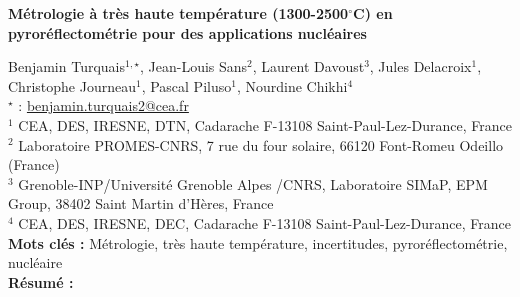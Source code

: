 


    \newpage


%
\begin{flushleft}
\addtocounter{section}{1}
{\Large \textbf{Métrologie à très haute température (1300-2500$^{\circ}$C) en pyroréflectométrie pour des applications nucléaires}}\label{ref:14}
\end{flushleft}
%
Benjamin Turquais$^{1,\star}$, Jean-Louis Sans$^{2}$, Laurent Davoust$^{3}$, Jules Delacroix$^{1}$, Christophe Journeau$^{1}$, Pascal Piluso$^{1}$, Nourdine Chikhi$^{4}$\\[2mm]
$^{\star}$ \Letter : \url{benjamin.turquais2@cea.fr}\\[2mm]
{\footnotesize $^{1}$ CEA, DES, IRESNE, DTN, Cadarache F-13108 Saint-Paul-Lez-Durance, France}\\
{\footnotesize $^{2}$ Laboratoire PROMES-CNRS, 7 rue du four solaire, 66120 Font-Romeu Odeillo (France)}\\
{\footnotesize $^{3}$ Grenoble-INP/Université Grenoble Alpes /CNRS, Laboratoire SIMaP, EPM Group, 38402 Saint Martin d'Hères, France}\\
{\footnotesize $^{4}$ CEA, DES, IRESNE, DEC, Cadarache F-13108 Saint-Paul-Lez-Durance, France}\\
[4mm]
%
\noindent \textbf{Mots clés : } Métrologie, très haute température, incertitudes, pyroréflectométrie, nucléaire\\[4mm]
%
\noindent \textbf{Résumé : } 


